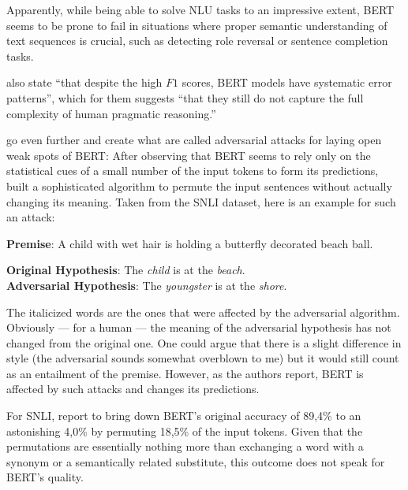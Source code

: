 Apparently, while being able to solve NLU tasks to an impressive extent, BERT seems to be prone
to fail in situations where proper semantic understanding of text sequences is crucial, such as
detecting role reversal or sentence completion tasks.

\cite{jiang2019evaluating} also state ``that despite the high $F1$ scores, BERT models have
systematic error patterns'', which for them suggests ``that they still do not capture the
full complexity of human pragmatic reasoning.''

\cite{jin2020bert} go even further and create what are called adversarial attacks for laying open
weak spots of BERT: After observing that BERT seems to rely only on the statistical cues of
a small number of the input tokens to form its predictions, \citeauthor{jin2020bert} built a
sophisticated algorithm to permute the input sentences without actually changing its meaning.
Taken from the SNLI \citep{bowman2015snli} dataset, here is an example for such an attack:

\begin{examples}
  \item \textbf{Premise}: A child with wet hair is holding a butterfly decorated beach ball.

        \textbf{Original Hypothesis}: The \emph{child} is at the \emph{beach}.\\
        \textbf{Adversarial Hypothesis}: The \emph{youngster} is at the \emph{shore}.
\end{examples}

The italicized words are the ones that were affected by the adversarial algorithm.
Obviously --- for a human --- the meaning of the adversarial hypothesis has not
changed from the original one. One could argue that there is a slight difference
in style (the adversarial sounds somewhat overblown to me) but it would still count
as an entailment of the premise. However, as the authors report, BERT is affected
by such attacks and changes its predictions.

For SNLI, \citeauthor{jin2020bert} report to bring down BERT's original accuracy of 89,4\%
to an astonishing 4,0\% by permuting 18,5\% of the input tokens. Given that the permutations
are essentially nothing more than exchanging a word with a synonym or a semantically related
substitute, this outcome does not speak for BERT's quality.




